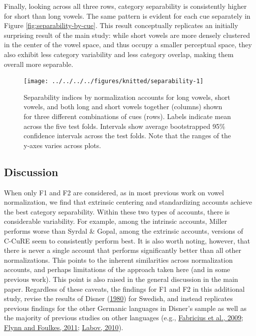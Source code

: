 \documentclass[utf8]{frontiers_suppmat} %
\begin{document}
Finally, looking across all three rows, category separability is consistently higher for short than long vowels. The same pattern is evident for each cue separately in Figure \ref{fig:separability-by-cue}. This result conceptually replicates an initially surprising result of the main study: while short vowels are more densely clustered in the center of the vowel space, and thus occupy a smaller perceptual space, they also exhibit less category variability and less category overlap, making them overall more separable.



\begin{figure}

{\centering \texttt{[image: ../../../../figures/knitted/separability-1]} }

\caption{Separability indices by normalization accounts for long vowels, short vowels, and both long and short vowels together (columns) shown for three different combinations of cues (rows). Labels indicate mean across the five test folds. Intervals show average bootstrapped 95\% confidence intervals across the test folds. Note that the ranges of the y-axes varies across plots.}\label{fig:separability}
\end{figure}

\hypertarget{sec:studyI-discussion}{%
\subsection{Discussion}\label{sec:studyI-discussion}}

When only F1 and F2 are considered, as in most previous work on vowel normalization, we find that extrinsic centering and standardizing accounts achieve the best category separability. Within these two types of accounts, there is considerable variability. For example, among the intrinsic accounts, Miller performs worse than Syrdal \& Gopal, among the extrinsic accounts, versions of C-CuRE seem to consistently perform best. It is also worth noting, however, that there is never a single account that performs significantly better than all other normalizations. This points to the inherent similarities across normalization accounts, and perhaps limitations of the approach taken here (and in some previous work). This point is also raised in the general discussion in the main paper. Regardless of these caveats, the findings for F1 and F2 in this additional study, revise the results of Disner (\protect\hyperlink{ref-disner1980}{1980}) for Swedish, and instead replicates previous findings for the other Germanic languages in Disner's sample as well as the majority of previous studies on other languages (e.g., \protect\hyperlink{ref-fabricius2009}{Fabricius et al., 2009}; \protect\hyperlink{ref-Flynn2011}{Flynn and Foulkes, 2011}; \protect\hyperlink{ref-labov2010}{Labov, 2010}).
\end{document}
